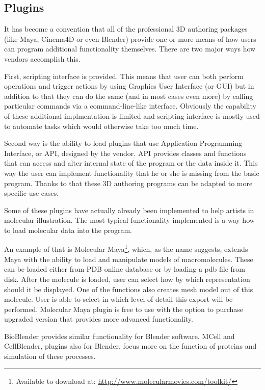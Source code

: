 \documentclass[
  digital, %
  table,   %
  nolof,     %
  nolot,     %
]{fithesis3}
\begin{document}
\subsection{Plugins}
It has become a convention that all of the professional 3D authoring packages (like Maya, Cinema4D or even Blender) provide one or more means of how users can program additional functionality themselves. There are two major ways how vendors accomplish this.

First, scripting interface is provided. This means that user can both perform operations and trigger actions by using Graphics User Interface (or GUI) but in addition to that they can do the same (and in most cases even more) by calling particular commands via a command-line-like interface. Obviously the capability of these additional implmentation is limited and scripting interface is mostly used to automate tasks which would otherwise take too much time.

Second way is the ability to load plugins that use Application Programming Interface, or API, designed by the vendor. API provides classes and functions that can access and alter internal state of the program or the data inside it. This way the user can implement functionality that he or she is missing from the basic program. Thanks to that these 3D authoring programs can be adapted to more specific use cases.

Some of these plugins have actually already been implemented to help artists in molecular illustration. The most typical functionality implemented is a way how to load molecular data into the program.

An example of that is Molecular Maya\footnote{Available to download at: \url{http://www.molecularmovies.com/toolkit/}}, which, as the name suggests, extends Maya with the ability to load and manipulate models of macromolecules. These can be loaded either from PDB online database or by loading a pdb file from disk. After the molecule is loaded, user can select how by which representation should it be displayed. One of the functions also creates mesh model out of this molecule. User is able to select in which level of detail this export will be performed. Molecular Maya plugin is free to use with the option to purchase upgraded version that provides more advanced functionality.

BioBlender provides similar functionality for Blender software. MCell and CellBlender\cite{mcell}, plugins also for Blender, focus more on the function of proteins and simulation of these processes.
\end{document}
